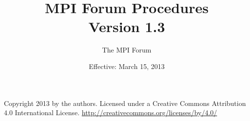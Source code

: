 \documentclass{book}
\begin{document}
\title{MPI Forum Procedures \\
Version 1.3}
\author{The MPI Forum}
\date{Effective: March 15, 2013}

\maketitle

\null\vfill
\thispagestyle{empty}
\noindent
Copyright 2013 by the authors. Licensed under a Creative Commons Attribution
4.0 International License. \url{http://creativecommons.org/licenses/by/4.0/}






\end{document}
